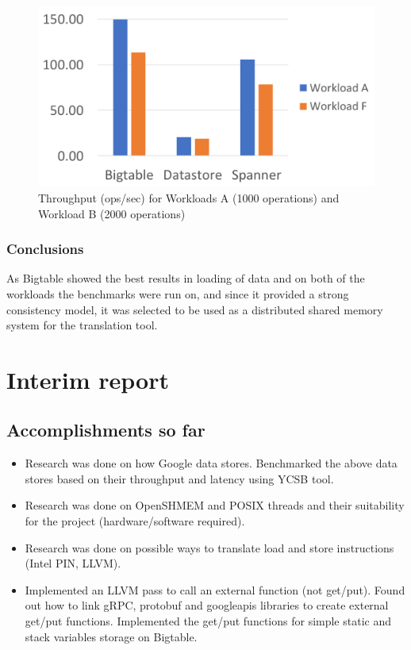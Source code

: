\documentclass[bsc,frontabs,twoside,singlespacing,parskip,deptreport]{infthesis}     %
\begin{document}
\begin{figure}[h]
	\centering
	\includegraphics[width=12cm]{throughput}
	\caption{Throughput (ops/sec) for Workloads A (1000 operations) and Workload B (2000 operations)}
	\label{throughput}
\end{figure}

\subsection{Conclusions}

As Bigtable showed the best results in loading of data and on both of the workloads the benchmarks were run on, and since it provided a strong consistency model, it was selected to be used as a distributed shared memory system for the translation tool.


\chapter{Interim report}

\section{Accomplishments so far}

\begin{itemize}
\item
Research was done on how Google data stores. Benchmarked the above data stores based on their throughput and latency using YCSB tool.
\item
Research was done on OpenSHMEM and POSIX threads and their suitability for the project (hardware/software required).
\item
Research was done on possible ways to translate load and store instructions (Intel PIN, LLVM).
\item
Implemented an LLVM pass to call an external function (not get/put). Found out how to link gRPC, protobuf and googleapis libraries to create external get/put functions. Implemented the get/put functions for simple static and stack variables storage on Bigtable.
\end{itemize}
\end{document}
